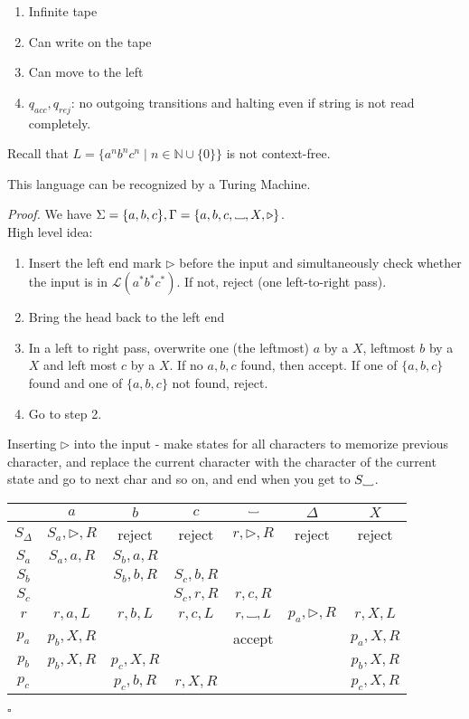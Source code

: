 \documentclass[a4paper]{article}
\newenvironment{proof}{\begin{breakbox}\textit{Proof.}}{\hfill$\square$\end{breakbox}}
\newcommand{\nl}{\vspace{0.2cm}\\}
\newcommand{\mc}{\mathcal}
\newcommand{\mb}{\mathbb}
\renewcommand{\L}{\mc{L}}
\newcommand\Vtextvisiblespace[1][.3em]{%
  \mbox{\kern.06em\vrule height.3ex}%
  \vbox{\hrule width#1}%
  \hbox{\vrule height.3ex}
}
\newcommand{\blank}{{\Vtextvisiblespace[0.7em]}}
\newcommand{\leftend}{\triangleright}
\begin{document}
\begin{enumerate}
    \item Infinite tape
    \item Can write on the tape
    \item Can move to the left
    \item $q_{acc}, q_{rej}$: no outgoing transitions and halting even if string is not read completely.
\end{enumerate}

Recall that $L = \{a^n b^n c^n \mid n \in \mb{N} \cup \{0\}\}$ is not context-free.

\begin{claim}
    This language can be recognized by a Turing Machine.
\end{claim}

\begin{proof}
    We have $\Sigma = \{a, b, c\}, \Gamma = \{a, b, c, \blank, X, \leftend\}$.\nl
    High level idea:
    \begin{enumerate}
        \item Insert the left end mark $\leftend$ before the input and simultaneously check whether the input is in $\L(a^*b^*c^*)$. If not, reject (one left-to-right pass).
        \item Bring the head back to the left end
        \item In a left to right pass, overwrite one (the leftmost) $a$ by a $X$, leftmost $b$ by a $X$ and left most $c$ by a $X$. If no $a, b, c$ found, then accept. If one of $\{a, b, c\}$
            found and one of $\{a, b, c\}$ not found, reject.
        \item Go to step 2.
    \end{enumerate}
    Inserting $\leftend$ into the input - make states for all characters to memorize previous character, and replace the current character with the character of the current state and go
    to next char and so on, and end when you get to $S_{\blank}$.
\begin{center}
\begin{tabular}{|c|c|c|c|c|c|c|}
    \hline
     & $a$ & $b$ & $c$ & $\blank$ & $\Delta$ & $X$ \\
    \hline
    $S_\Delta$ & $S_a, \leftend, R$ & reject & reject & $r, \leftend, R$ & reject & reject \\
    \hline
    $S_a$ & $S_a, a, R$ & $S_b, a, R$ &  &  &  &  \\
    \hline
    $S_b$ &  & $S_b, b, R$ & $S_c, b, R$ &  &  &  \\
    \hline
    $S_c$ &  &  & $S_c, r, R$ & $r, c, R$ &  &  \\
    \hline
    $r$ & $r, a, L$ & $r, b, L$ & $r, c, L$ & $r, \blank, L$ & $p_a, \leftend, R$ & $r, X, L$ \\
    \hline
    $p_a$ & $p_b, X, R$ &  &  & accept &  & $p_a, X, R$ \\
    \hline
    $p_b$ & $p_b, X, R$ & $p_c, X, R$ &  &  &  & $p_b, X, R$ \\
    \hline
    $p_c$ &  & $p_c, b, R$ & $r, X, R$ &  &  & $p_c, X, R$ \\
    \hline
\end{tabular}
\end{center}


\end{proof}
\end{document}
